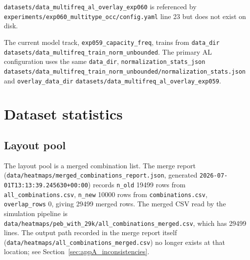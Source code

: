 \texttt{datasets/\allowbreak{}data\_\allowbreak{}multifreq\_\allowbreak{}al\_\allowbreak{}overlay\_\allowbreak{}exp060} is referenced by
\texttt{experiments/\allowbreak{}exp060\_\allowbreak{}multitype\_\allowbreak{}occ/\allowbreak{}config.yaml} line 23 but does not exist on disk.

The current model track, \texttt{exp059\_capacity\_freq}, trains from \texttt{data\_dir}
\texttt{datasets/\allowbreak{}data\_\allowbreak{}multifreq\_\allowbreak{}train\_\allowbreak{}norm\_\allowbreak{}unbounded}. The primary AL configuration uses the
same \texttt{data\_dir}, \texttt{normalization\_stats\_json}
\texttt{datasets/\allowbreak{}data\_\allowbreak{}multifreq\_\allowbreak{}train\_\allowbreak{}norm\_\allowbreak{}unbounded/\allowbreak{}normalization\_\allowbreak{}stats.json} and
\texttt{overlay\_data\_dir} \texttt{datasets/\allowbreak{}data\_\allowbreak{}multifreq\_\allowbreak{}al\_\allowbreak{}overlay\_\allowbreak{}exp059}.


\section{Dataset statistics}
\label{sec:appA_dataset_stats}

\subsection{Layout pool}
\label{subsec:appA_layout_pool}

The layout pool is a merged combination list. The merge report
(\texttt{data/\allowbreak{}heatmaps/\allowbreak{}merged\_\allowbreak{}combinations\_\allowbreak{}report.json}, generated
\texttt{2026-07-01T13:13:39.245630+00:00}) records \texttt{n\_old} 19499 rows from
\texttt{all\_combinations.csv}, \texttt{n\_new} 10000 rows from \texttt{combinations.csv},
\texttt{overlap\_rows} 0, giving 29499 merged rows. The merged CSV read by the simulation pipeline
is \texttt{data/\allowbreak{}heatmaps/\allowbreak{}peb\_\allowbreak{}with\_\allowbreak{}29k/\allowbreak{}all\_\allowbreak{}combinations\_\allowbreak{}merged.csv}, which has 29499 lines.
The output path recorded in the merge report itself
(\texttt{data/\allowbreak{}heatmaps/\allowbreak{}all\_\allowbreak{}combinations\_\allowbreak{}merged.csv}) no longer exists at that location; see
Section~\ref{sec:appA_inconsistencies}.

